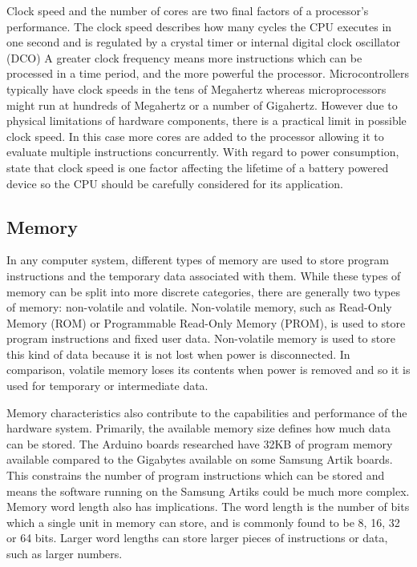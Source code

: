       Clock speed and the number of cores are two final factors of a processor's performance. The clock speed describes how many cycles the CPU executes in one second and is regulated by a crystal timer or internal digital clock oscillator (DCO) A greater clock frequency means more instructions which can be processed in a time period, and the more powerful the processor. Microcontrollers typically have clock speeds in the tens of Megahertz whereas microprocessors might run at hundreds of Megahertz or a number of Gigahertz. However due to physical limitations of hardware components, there is a practical limit in possible clock speed. In this case more cores are added to the processor allowing it to evaluate multiple instructions concurrently. With regard to power consumption, \citet{wsnpower:2010} state that clock speed is one factor affecting the lifetime of a battery powered device so the CPU should be carefully considered for its application.

    \subsection{Memory}
      In any computer system, different types of memory are used to store program instructions and the temporary data associated with them. While these types of memory can be split into more discrete categories, there are generally two types of memory: non-volatile and volatile. Non-volatile memory, such as Read-Only Memory (ROM) or Programmable Read-Only Memory (PROM), is used to store program instructions and fixed user data. Non-volatile memory is used to store this kind of data because it is not lost when power is disconnected. In comparison, volatile memory loses its contents when power is removed and so it is used for temporary or intermediate data.

      Memory characteristics also contribute to the capabilities and performance of the hardware system. Primarily, the available memory size defines how much data can be stored. The Arduino boards researched have 32KB of program memory available compared to the Gigabytes available on some Samsung Artik boards. This constrains the number of program instructions which can be stored and means the software running on the Samsung Artiks could be much more complex. Memory word length also has implications. The word length is the number of bits which a single unit in memory can store, and is commonly found to be 8, 16, 32 or 64 bits. Larger word lengths can store larger pieces of instructions or data, such as larger numbers. 

